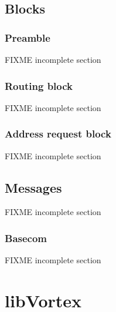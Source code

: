 \subsection{Blocks}
\subsubsection{Preamble}
FIXME incomplete section

\subsubsection{Routing block}
FIXME incomplete section

\subsubsection{Address request block}
FIXME incomplete section

\subsection{Messages}
FIXME incomplete section

\subsubsection{Basecom}
FIXME incomplete section

\section{libVortex}